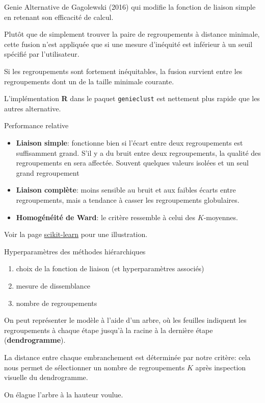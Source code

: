 \documentclass[
  ignorenonframetext,
]{beamer}
\providecommand{\tightlist}{%
  \setlength{\itemsep}{0pt}\setlength{\parskip}{0pt}}\usepackage{longtable,booktabs,array}
\begin{document}
\begin{frame}[fragile]{Genie}
\protect\hypertarget{genie}{}
Alternative de Gagolewski (2016) qui modifie la fonction de liaison
simple en retenant son efficacité de calcul.

Plutôt que de simplement trouver la paire de regroupements à distance
minimale, cette fusion n'est appliquée que si une mesure d'inéquité est
inférieur à un seuil spécifié par l'utilisateur.

Si les regroupements sont fortement inéquitables, la fusion survient
entre les regroupements dont un de la taille minimale courante.

L'implémentation \textbf{R} dans le paquet \texttt{genieclust} est
nettement plus rapide que les autres alternative.
\end{frame}

\begin{frame}{Performance relative}
\protect\hypertarget{performance-relative}{}
\begin{itemize}
\item
  \textbf{Liaison simple}: fonctionne bien si l'écart entre deux
  regroupements est suffisamment grand. S'il y a du bruit entre deux
  regroupements, la qualité des regroupements en sera affectée. Souvent
  quelques valeurs isolées et un seul grand regroupement
\item
  \textbf{Liaison complète}: moins sensible au bruit et aux faibles
  écarts entre regroupements, mais a tendance à casser les regroupements
  globulaires.
\item
  \textbf{Homogénéité de Ward}: le critère ressemble à celui des
  \(K\)-moyennes.
\end{itemize}

Voir la page
\href{https://scikit-learn.org/stable/auto_examples/cluster/plot_linkage_comparison.html}{scikit-learn}
pour une illustration.
\end{frame}

\begin{frame}{Hyperparamètres des méthodes hiérarchiques}
\protect\hypertarget{hyperparamuxe8tres-des-muxe9thodes-hiuxe9rarchiques}{}
\begin{enumerate}
\tightlist
\item
  choix de la fonction de liaison (et hyperparamètres associés)
\item
  mesure de dissemblance
\item
  nombre de regroupements
\end{enumerate}

On peut représenter le modèle à l'aide d'un arbre, où les feuilles
indiquent les regroupements à chaque étape jusqu'à la racine à la
dernière étape (\textbf{dendrogramme}).

La distance entre chaque embranchement est déterminée par notre critère:
cela nous permet de sélectionner un nombre de regroupements \(K\) après
inspection visuelle du dendrogramme.

On élague l'arbre à la hauteur voulue.
\end{frame}
\end{document}
